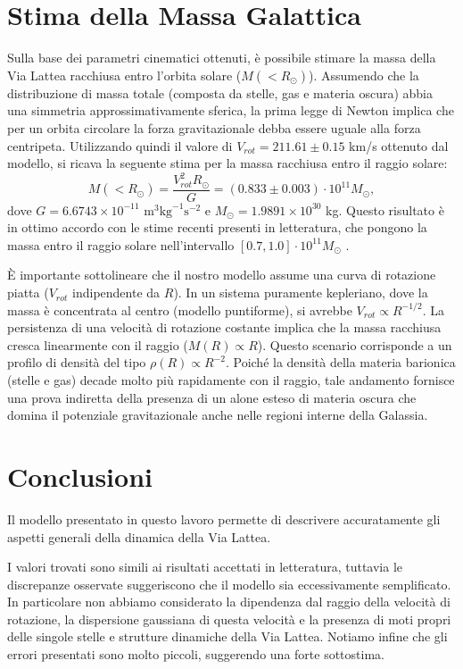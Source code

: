 \documentclass[twocolumn]{article}
\begin{document}
\iffalse
\section{Stima della Massa Galattica}
Sulla base dei parametri cinematici ottenuti, è possibile stimare la massa della Via Lattea racchiusa entro l'orbita solare ($M(< R_\odot)$). Assumendo che la distribuzione di massa totale (composta da stelle, gas e materia oscura) abbia una simmetria approssimativamente sferica, la prima legge di Newton implica che per un orbita circolare la forza gravitazionale debba essere uguale alla forza centripeta.
Utilizzando quindi il valore di $V_{rot} = 211.61 \pm 0.15$ km/s ottenuto dal modello, si ricava la seguente stima per la massa racchiusa entro il raggio solare:
\[ M\left( < R_\odot \right) = \frac{V_{rot}^2 R_\odot}{G} = (0.833 \pm 0.003) \cdot 10^{11} M_\odot, \]
dove $G=6.6743 \times 10^{-11} \text{ m}^3 \text{kg}^{-1} \text{s}^{-2}$ e $M_\odot=1.9891\times 10^{30}$ kg. Questo risultato è in ottimo accordo con le stime recenti presenti in letteratura, che pongono la massa entro il raggio solare nell'intervallo $[0.7, 1.0] \cdot 10^{11} M_\odot$ \cite{Jiao2023}.

È importante sottolineare che il nostro modello assume una curva di rotazione piatta ($V_{rot}$ indipendente da $R$). In un sistema puramente kepleriano, dove la massa è concentrata al centro (modello puntiforme), si avrebbe $V_{rot}\propto R^{-1/2}$. La persistenza di una velocità di rotazione costante implica che la massa racchiusa cresca linearmente con il raggio ($M(R) \propto R$). Questo scenario corrisponde a un profilo di densità del tipo $\rho(R) \propto R^{-2}$. 
Poiché la densità della materia barionica (stelle e gas) decade molto più rapidamente con il raggio, tale andamento fornisce una prova indiretta della presenza di un alone esteso di materia oscura che domina il potenziale gravitazionale anche nelle regioni interne della Galassia.

\section{Conclusioni}
Il modello presentato in questo lavoro permette di descrivere accuratamente gli aspetti generali della dinamica della Via Lattea.

I valori trovati sono simili ai risultati accettati in letteratura, tuttavia le discrepanze osservate suggeriscono che il modello sia eccessivamente semplificato.
In particolare non abbiamo considerato la dipendenza dal raggio della velocità di rotazione, la dispersione gaussiana di questa velocità e la presenza di moti propri delle singole stelle e strutture dinamiche della Via Lattea.
Notiamo infine che gli errori presentati sono molto piccoli, suggerendo una forte sottostima.
\end{document}
